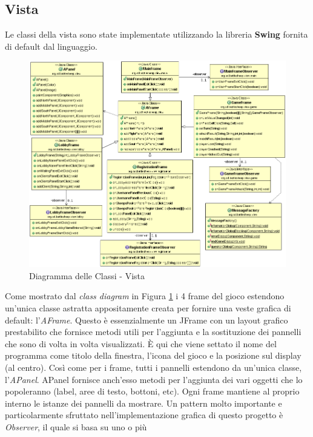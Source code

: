 \subsection{Vista}
Le classi della vista sono state implementate utilizzando la libreria
\textbf{Swing} fornita di default dal linguaggio.
\begin{figure}[!ht]
	\centering
	\includegraphics[scale=0.45,center]{core/imgs/UML/VistaBellaUML-noattr.png}
	\caption{Diagramma delle Classi - Vista}
	\label{figure:class_diagram_view}
\end{figure}
Come mostrato dal \textit{class diagram} in Figura \ref{figure:class_diagram_view} 
i 4 frame del gioco estendono un'unica
classe astratta appositamente creata per fornire una veste grafica di default:
l'\textit{AFrame}. Questo è essenzialmente un JFrame con un layout grafico
prestabilito che fornisce metodi utili per l'aggiunta e la sostituzione dei
pannelli che sono di volta in volta visualizzati. È qui che viene settato il
nome del programma come titolo della finestra, l'icona del gioco e la posizione sul display (al centro).\newline
Così come per i frame, tutti i pannelli estendono da un'unica classe,
l'\textit{APanel}. APanel fornisce anch'esso metodi per l'aggiunta dei vari oggetti che
lo popoleranno (label, aree di testo, bottoni, etc). Ogni frame mantiene al
proprio interno le istanze dei pannelli da mostrare.\newline
Un pattern molto importante e particolarmente sfruttato nell'implementazione
grafica di questo progetto è \textit{Observer}, il quale si basa su uno o più
